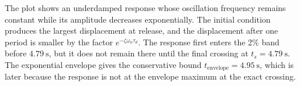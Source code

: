 \clearpage
{}



The plot shows an underdamped response whose oscillation frequency remains constant while its amplitude decreases exponentially. The initial condition produces the largest displacement at release, and the displacement after one period is smaller by the factor $e^{-\zeta\omega_n\tau_d}$. The response first enters the 2\% band before $4.79\ \mathrm{s}$, but it does not remain there until the final crossing at $t_s=4.79\ \mathrm{s}$. The exponential envelope gives the conservative bound $t_{\mathrm{envelope}}=4.95\ \mathrm{s}$, which is later because the response is not at the envelope maximum at the exact crossing.

\endgroup
